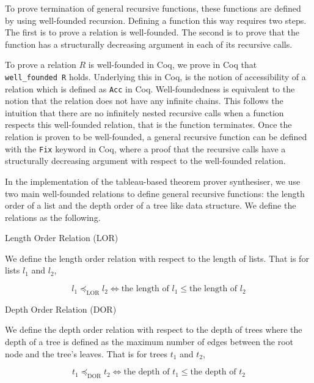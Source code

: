 \documentclass{llncs}
\begin{document}
To prove termination of general recursive functions, these functions are
defined by using well-founded recursion. Defining a function this way requires
two steps. The first is to prove a relation is well-founded. The second is to
prove that the function has a structurally decreasing argument in each of its
recursive calls.

To prove a relation $R$ is well-founded in Coq, we prove in Coq that
\\\verb+well_founded R+ holds. Underlying this in Coq, is the notion of
accessibility of a relation which is defined as \verb+Acc+ in Coq.
Well-foundedness is equivalent to the notion that the relation does not have
any infinite chains. This follows the intuition that there are no infinitely
nested recursive calls when a function respects this well-founded relation,
that is the function terminates. Once the relation is proven to be
well-founded, a general recursive function can be defined with the \verb+Fix+
keyword in Coq, where a proof that the recursive calls have a structurally 
decreasing argument with respect to the well-founded relation.

In the implementation of the tableau-based theorem prover synthesiser, we use
two main well-founded relations to define general recursive functions: the
length order of a list and the depth order of a tree like data structure.
We define the relations as the following.

\begin{definition}{Length Order Relation (LOR)}

We define the length order relation with respect to the length of lists.
That is for lists $l_1$ and $l_2$,

\begin{equation}
l_1 \preceq_{\textrm{LOR}} l_2 \iff \textrm{the
length of } l_1 \le \textrm{the length of } l_2
\label{lengthOrder}
\end{equation}
\end{definition}

\begin{definition}{Depth Order Relation (DOR)}

We define the depth order relation with respect to the depth of trees where the
depth of a tree is defined as the maximum number of edges between the root node
and the tree's leaves.
That is for trees $t_1$ and $t_2$,

\begin{equation}
t_1 \preceq_{\textrm{DOR}} t_2 \iff \textrm{the
depth of } t_1 \leq \textrm{the depth of } t_2
\label{depthOrder}
\end{equation}
\end{definition}
\end{document}
